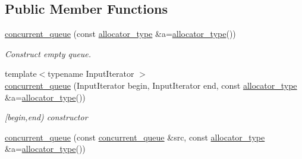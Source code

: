 \subsection*{Public Member Functions}
\begin{DoxyCompactItemize}
\item 
\hypertarget{classtbb_1_1strict__ppl_1_1concurrent__queue_a49b2e16902577cd3174355be0fa684e5}{}\hyperlink{classtbb_1_1strict__ppl_1_1concurrent__queue_a49b2e16902577cd3174355be0fa684e5}{concurrent\+\_\+queue} (const \hyperlink{classtbb_1_1strict__ppl_1_1concurrent__queue_acbdd1a5bd034358fb0774b322a66b1ed}{allocator\+\_\+type} \&a=\hyperlink{classtbb_1_1strict__ppl_1_1concurrent__queue_acbdd1a5bd034358fb0774b322a66b1ed}{allocator\+\_\+type}())\label{classtbb_1_1strict__ppl_1_1concurrent__queue_a49b2e16902577cd3174355be0fa684e5}

\begin{DoxyCompactList}\small\item\em Construct empty queue. \end{DoxyCompactList}\item 
\hypertarget{classtbb_1_1strict__ppl_1_1concurrent__queue_a43ac953152e60815c09fe4a4d4a623a9}{}{\footnotesize template$<$typename Input\+Iterator $>$ }\\\hyperlink{classtbb_1_1strict__ppl_1_1concurrent__queue_a43ac953152e60815c09fe4a4d4a623a9}{concurrent\+\_\+queue} (Input\+Iterator begin, Input\+Iterator end, const \hyperlink{classtbb_1_1strict__ppl_1_1concurrent__queue_acbdd1a5bd034358fb0774b322a66b1ed}{allocator\+\_\+type} \&a=\hyperlink{classtbb_1_1strict__ppl_1_1concurrent__queue_acbdd1a5bd034358fb0774b322a66b1ed}{allocator\+\_\+type}())\label{classtbb_1_1strict__ppl_1_1concurrent__queue_a43ac953152e60815c09fe4a4d4a623a9}

\begin{DoxyCompactList}\small\item\em \mbox{[}begin,end) constructor \end{DoxyCompactList}\item 
\hypertarget{classtbb_1_1strict__ppl_1_1concurrent__queue_ae918807d098d5d5b41cc6d606fa2e7a1}{}\hyperlink{classtbb_1_1strict__ppl_1_1concurrent__queue_ae918807d098d5d5b41cc6d606fa2e7a1}{concurrent\+\_\+queue} (const \hyperlink{classtbb_1_1strict__ppl_1_1concurrent__queue}{concurrent\+\_\+queue} \&src, const \hyperlink{classtbb_1_1strict__ppl_1_1concurrent__queue_acbdd1a5bd034358fb0774b322a66b1ed}{allocator\+\_\+type} \&a=\hyperlink{classtbb_1_1strict__ppl_1_1concurrent__queue_acbdd1a5bd034358fb0774b322a66b1ed}{allocator\+\_\+type}())\label{classtbb_1_1strict__ppl_1_1concurrent__queue_ae918807d098d5d5b41cc6d606fa2e7a1}


\end{DoxyCompactItemize}
